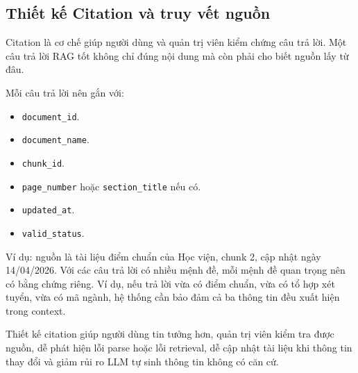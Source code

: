 \subsection{Thiết kế Citation và truy vết nguồn}

Citation là cơ chế giúp người dùng và quản trị viên kiểm chứng câu trả lời. Một câu trả lời RAG tốt không chỉ đúng nội dung mà còn phải cho biết nguồn lấy từ đâu.

Mỗi câu trả lời nên gắn với:

\begin{itemize}
    \item \texttt{document\_id}.
    \item \texttt{document\_name}.
    \item \texttt{chunk\_id}.
    \item \texttt{page\_number} hoặc \texttt{section\_title} nếu có.
    \item \texttt{updated\_at}.
    \item \texttt{valid\_status}.
\end{itemize}

Ví dụ: nguồn là tài liệu điểm chuẩn của Học viện, chunk 2, cập nhật ngày 14/04/2026. Với các câu trả lời có nhiều mệnh đề, mỗi mệnh đề quan trọng nên có bằng chứng riêng. Ví dụ, nếu trả lời vừa có điểm chuẩn, vừa có tổ hợp xét tuyển, vừa có mã ngành, hệ thống cần bảo đảm cả ba thông tin đều xuất hiện trong context.

Thiết kế citation giúp người dùng tin tưởng hơn, quản trị viên kiểm tra được nguồn, dễ phát hiện lỗi parse hoặc lỗi retrieval, dễ cập nhật tài liệu khi thông tin thay đổi và giảm rủi ro LLM tự sinh thông tin không có căn cứ.
